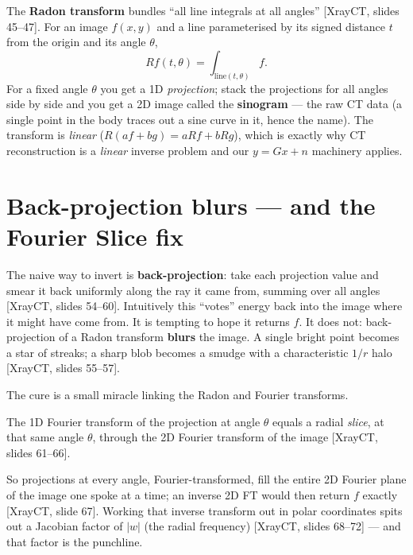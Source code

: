 \documentclass[11pt]{article}
\newcommand{\abs}[1]{\left\lvert #1 \right\rvert}
\newcommand{\deck}[1]{\textsf{\small[#1]}}
\begin{document}
The \textbf{Radon transform} bundles ``all line integrals at all angles''
\deck{XrayCT, slides 45--47}. For an image $f(x,y)$ and a line parameterised by
its signed distance $t$ from the origin and its angle $\theta$,
\[
Rf(t,\theta) = \int_{\text{line}(t,\theta)} f .
\]
For a fixed angle $\theta$ you get a 1D \emph{projection}; stack the projections
for all angles side by side and you get a 2D image called the \textbf{sinogram}
--- the raw CT data (a single point in the body traces out a sine curve in it,
hence the name). The transform is \emph{linear}
($R(af+bg)=aRf+bRg$), which is exactly why CT reconstruction is a \emph{linear}
inverse problem and our $y=Gx+n$ machinery applies.

\section{Back-projection blurs --- and the Fourier Slice fix}

The naive way to invert is \textbf{back-projection}: take each projection value
and smear it back uniformly along the ray it came from, summing over all angles
\deck{XrayCT, slides 54--60}. Intuitively this ``votes'' energy back into the
image where it might have come from. It is tempting to hope it returns $f$. It
does not: back-projection of a Radon transform \textbf{blurs} the image. A single
bright point becomes a star of streaks; a sharp blob becomes a smudge with a
characteristic $1/r$ halo \deck{XrayCT, slides 55--57}.

The cure is a small miracle linking the Radon and Fourier transforms.

\begin{keybox}
The 1D Fourier transform of the projection at angle $\theta$ equals a radial
\emph{slice}, at that same angle $\theta$, through the 2D Fourier transform of
the image \deck{XrayCT, slides 61--66}.
\end{keybox}

So projections at every angle, Fourier-transformed, fill the entire 2D Fourier
plane of the image one spoke at a time; an inverse 2D FT would then return $f$
exactly \deck{XrayCT, slide 67}. Working that inverse transform out in polar
coordinates spits out a Jacobian factor of $\abs{w}$ (the radial frequency)
\deck{XrayCT, slides 68--72} --- and that factor is the punchline.
\end{document}
